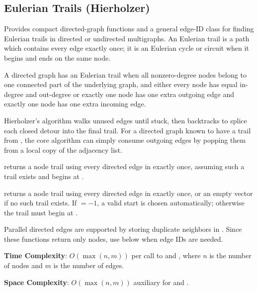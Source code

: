 \subsection{Eulerian Trails (Hierholzer)}
\label{sec:4.1.9}
Provides compact directed-graph functions and a general edge-ID class for finding Eulerian trails in directed or undirected multigraphs. An Eulerian trail is a path which contains every edge exactly once; it is an Eulerian cycle or circuit when it begins and ends on the same node.

A directed graph has an Eulerian trail when all nonzero-degree nodes belong to one connected part of the underlying graph, and either every node has equal in-degree and out-degree or exactly one node has one extra outgoing edge and exactly one node has one extra incoming edge.

Hierholzer's algorithm walks unused edges until stuck, then backtracks to splice each closed detour into the final trail. For a directed graph known to have a trail from , the core algorithm can simply consume outgoing edges by popping them from a local copy of the adjacency list.

\begin{compactitem}
  \item {} returns a node trail using every directed edge in  exactly once, assuming such a trail exists and begins at .
  \item {} returns a node trail using every directed edge in  exactly once, or an empty vector if no such trail exists. If  $= -1$, a valid start is chosen automatically; otherwise the trail must begin at .
\end{compactitem}

Parallel directed edges are supported by storing duplicate neighbors in . Since these functions return only nodes, use  below when edge IDs are needed.

\textbf{Time Complexity}: $O(\max\left(n, m\right))$ per call to  and , where $n$ is the number of nodes and $m$ is the number of edges.

\textbf{Space Complexity}: $O(\max\left(n, m\right))$ auxiliary for  and .


